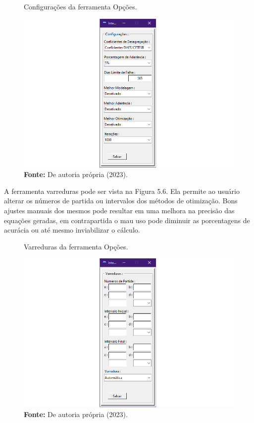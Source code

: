 \newpage

\begin{figure}[!ht]
	\centering
	\caption{Configurações da ferramenta Opções.}
	\includegraphics[width=.7615\linewidth]{figuras/configuracoes.png}
	\caption*{\textbf{Fonte:} De autoria própria (2023).}
	\label{fig:figuras/configuracoes.png}
\end{figure}

A ferramenta varreduras pode ser vista na Figura 5.6. Ela permite ao usuário alterar os números de partida ou intervalos dos métodos de otimização. Bons ajustes manuais dos mesmos pode resultar em uma melhora na precisão das equações geradas, em contrapartida o mau uso pode diminuir as porcentagens de acurácia ou até mesmo inviabilizar o cálculo.\bigskip

\begin{figure}[!ht]
	\centering
	\caption{Varreduras da ferramenta Opções.}
	\includegraphics[width=.7615\linewidth]{figuras/varreduras.png}
	\caption*{\textbf{Fonte:} De autoria própria (2023).}
	\label{fig:figuras/varreduras.png}
\end{figure}

\newpage

